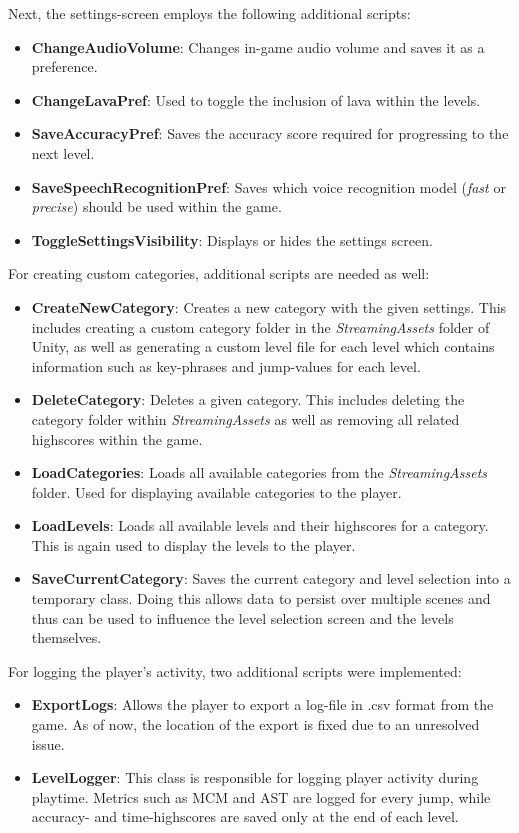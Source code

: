 \documentclass[draft,final]{vutinfth} %
\begin{document}
Next, the settings-screen employs the following additional scripts:
\begin{itemize}
 \item \textbf{ChangeAudioVolume}: Changes in-game audio volume and saves it as a preference.
 \item \textbf{ChangeLavaPref}: Used to toggle the inclusion of lava within the levels.
 \item \textbf{SaveAccuracyPref}: Saves the accuracy score required for progressing to the next level.
 \item \textbf{SaveSpeechRecognitionPref}: Saves which voice recognition model (\emph{fast} or \emph{precise}) should be used within the game.
 \item \textbf{ToggleSettingsVisibility}: Displays or hides the settings screen.
\end{itemize}

For creating custom categories, additional scripts are needed as well:
\begin{itemize}
\item \textbf{CreateNewCategory}: Creates a new category with the given settings. This includes creating a custom category folder in the \emph{StreamingAssets} folder of Unity, as well as generating a custom level file for each level which contains information such as key-phrases and jump-values for each level.
\item \textbf{DeleteCategory}: Deletes a given category. This includes deleting the category folder within \emph{StreamingAssets} as well as removing all related highscores within the game.
\item \textbf{LoadCategories}: Loads all available categories from the \emph{StreamingAssets} folder. Used for displaying available categories to the player.
\item \textbf{LoadLevels}: Loads all available levels and their highscores for a category. This is again used to display the levels to the player.
\item \textbf{SaveCurrentCategory}: Saves the current category and level selection into a temporary class. Doing this allows data to persist over multiple scenes and thus can be used to influence the level selection screen and the levels themselves.  
\end{itemize}

For logging the player's activity, two additional scripts were implemented:
\begin{itemize}
\item \textbf{ExportLogs}: Allows the player to export a log-file in .csv format from the game. As of now, the location of the export is fixed due to an unresolved issue.
\item \textbf{LevelLogger}: This class is responsible for logging player activity during playtime. Metrics such as MCM and AST are logged for every jump, while accuracy- and time-highscores are saved only at the end of each level.
\end{itemize}
\end{document}
